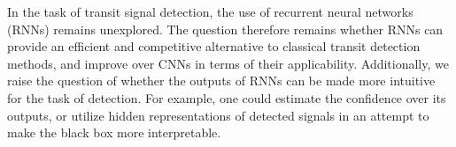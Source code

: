 In the task of transit signal detection, the use of recurrent neural networks (RNNs) remains unexplored. The question therefore remains whether RNNs can provide an efficient and competitive alternative to classical transit detection methods, and improve over CNNs in terms of their applicability. Additionally, we raise the question of whether the outputs of RNNs can be made more intuitive for the task of detection. For example, one could estimate the confidence over its outputs, or utilize hidden representations of detected signals in an attempt to make the black box more interpretable.



